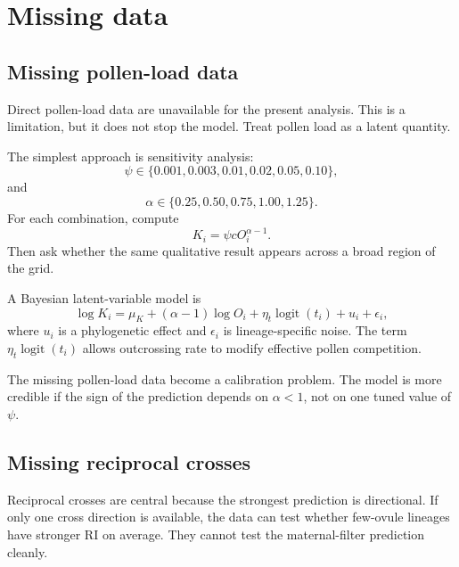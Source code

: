 \documentclass[12pt]{article}
\newcommand{\logit}{\operatorname{logit}}
\begin{document}
\section{Missing data}

\subsection{Missing pollen-load data}

Direct pollen-load data are unavailable for the present analysis. This is a limitation, but it does not stop the model. Treat pollen load as a latent quantity.

The simplest approach is sensitivity analysis:
\begin{equation}
\psi\in\{0.001,0.003,0.01,0.02,0.05,0.10\},
\end{equation}
and
\begin{equation}
\alpha\in\{0.25,0.50,0.75,1.00,1.25\}.
\end{equation}
For each combination, compute
\begin{equation}
K_i=\psi cO_i^{\alpha-1}.
\end{equation}
Then ask whether the same qualitative result appears across a broad region of the grid.

A Bayesian latent-variable model is
\begin{equation}
\log K_i=\mu_K+(\alpha-1)\log O_i+\eta_t\logit(t_i)+u_i+\epsilon_i,
\label{eq:latentK}
\end{equation}
where $u_i$ is a phylogenetic effect and $\epsilon_i$ is lineage-specific noise. The term $\eta_t\logit(t_i)$ allows outcrossing rate to modify effective pollen competition.

\begin{conclusionbox}
The missing pollen-load data become a calibration problem. The model is more credible if the sign of the prediction depends on $\alpha<1$, not on one tuned value of $\psi$.
\end{conclusionbox}

\subsection{Missing reciprocal crosses}

Reciprocal crosses are central because the strongest prediction is directional. If only one cross direction is available, the data can test whether few-ovule lineages have stronger RI on average. They cannot test the maternal-filter prediction cleanly.
\end{document}
